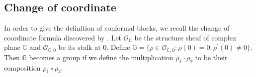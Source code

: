 \documentclass[11pt,b5paper,notitlepage]{article}
\theoremstyle{definition}
\newtheorem{df}{Definition}[subsection]
\theoremstyle{plain}
\newtheorem{pp}[df]{Proposition}
\newcommand{\wtd}{\widetilde}
\newcommand{\Vbb}{\mathbb V}
\newcommand{\Wbb}{\mathbb W}
\newcommand{\Gbb}{\mathbb G}
\newcommand{\Cbb}{\mathbb C}
\newcommand{\Nbb}{\mathbb N}
\newcommand{\cbf}{\mathbf c}
\newcommand{\wt}{\mathrm{wt}}
\newcommand{\Lss}{{L(0)_\mathrm{s}}}
\newcommand{\Lni}{{L(0)_\mathrm{n}}}
\newcommand{\<}{\left\langle}
\renewcommand{\>}{\right\rangle}
\newcommand{\MO}{\mathcal{O}}
\numberwithin{equation}{subsection}
\begin{document}
\begin{comment}
Suppose $\Wbb$ is a finitely admissible $\Vbb^{\times N}$-module with $\widetilde{L}(0)$-grading
$$
\Wbb=\bigoplus_{n\in \Nbb}\Wbb(n).
$$
The grading property $[\widetilde{L}_j(0),Y_i(v)_n]=\delta_{i,j}\big(Y_i(L(0)v)_n-(n+1)Y_i(v)_n\big)$ implies 
\begin{equation}\label{modulegrading}
Y_i(v)_m \Wbb(n)\subset \Wbb(n+\wt(v)-m-1)
\end{equation}
for homogeneous $v\in \Vbb$. By taking $v=\cbf$ in (\ref{modulegrading}), we see $L_i(n)$ lowers the $\wtd{L}(0)$-weight by $n$ and $\Wbb(n)$ is $L_i(0)$-invariant. We can decompose $L_0\vert_{\Wbb(n)}$ for each $n\in \Nbb$ by Jordan decomposition theorem in linear algebra, and then we get $L_0=\Lss+\Lni$ on $\Wbb$, where $\Lss$ is the semisimple part and $\Lni$ is the nilpotent part.\index{A@$\Lss,\Lni$} From this construction, we can see $\Lss$ and $\Lni$ preserve each $\Wbb(n)$. Denote the $\Lss$-grading of $\Wbb$ as 
$$
\Wbb=\bigoplus_{n\in \Cbb}\Wbb_{[n]}.
$$
\begin{pp}
    For each homogeneous $v\in \Vbb$, we have
    $$
    Y_\Wbb(v)_m \Wbb_{[n]}\subset \Wbb_{[n+\wt(v)-m-1]},
    $$
    and equivalently, $[\Lss,Y_\Wbb(v)_n]=Y_\Wbb(L_0 v)_n-(n+1)Y_\Wbb(v)_n$.
\end{pp}
\begin{df}
    Suppose $\Wbb$ is a $\Vbb$-module. 
    \begin{enumerate}
        \item[(1)] We say $\Wbb$ is \textbf{$\Lss$-semisimple}, if there exists a finite set $E\subset \Cbb$, such that 
    $$
    \Wbb=\bigoplus_{n\in E+\Nbb}\Wbb_{[n]}, \quad \dim \Wbb_{[n]}<\infty.
    $$
    \item[(2)] We say $\Wbb$ is \textbf{finitely generated} if there exists a finite subsets $\mathfrak{S}\subset \Wbb$, such that the smallest $\Vbb$-invariant subspace of $\Wbb$ containing $\mathfrak{S}$ is $\Wbb$.
    \end{enumerate}
\end{df}\index{3@$\Lss$-semisimple modules, finitely generated modules}
\begin{pp}
    When $\Vbb$ is $C_2$-cofinite, a $\Vbb$-module $\Wbb$ is $\Lss$-semisimple if and only if it is finitely generated.
\end{pp}
\end{comment}
\subsection{Change of coordinate}
In order to give the definition of conformal blocks, we recall the change of coordinate formula discovered by \cite{Hua97}. Let $\MO_\Cbb$ be the structure sheaf of complex plane $\Cbb$ and $\MO_{\Cbb,0}$ be its stalk at 0. Define $\Gbb=\{\rho\in \MO_{\Cbb,0}:\rho(0)=0,\rho^\prime(0)\ne 0\}$. Then $\Gbb$ becomes a group if we define the multiplication $\rho_1\cdot \rho_2$ to be their composition $\rho_1\circ \rho_2$. \index{G@$\Gbb$}
\end{document}
